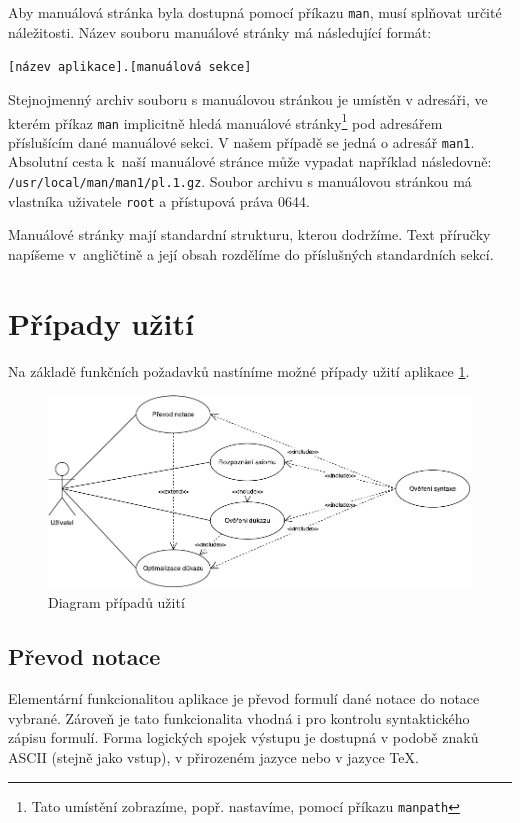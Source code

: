 \documentclass[thesis=B,czech,hidelinks]{thesis}[2012/06/26]
\begin{document}
Aby manuálová stránka byla dostupná pomocí příkazu \texttt{man}, musí splňovat určité náležitosti. Název souboru manuálové stránky má následující formát:

\begin{center}
\texttt{[název aplikace].[manuálová sekce]}
\end{center}

Stejnojmenný archiv souboru s manuálovou stránkou je umístěn v adresáři, ve kterém příkaz \texttt{man} implicitně hledá manuálové stránky\footnote{Tato umístění zobrazíme, popř. nastavíme, pomocí příkazu \texttt{manpath}} pod adresářem příslušícím dané manuálové sekci. V našem případě se jedná o adresář \texttt{man1}. Absolutní cesta k~naší manuálové stránce může vypadat například následovně: \texttt{/usr/local/man/man1/pl.1.gz}. Soubor archivu s manuálovou stránkou má vlastníka uživatele \texttt{root} a přístupová práva 0644.

Manuálové stránky mají standardní strukturu, kterou dodržíme. Text příručky napíšeme v~angličtině a její obsah rozdělíme do příslušných standardních sekcí.

\section{Případy užití}

Na základě funkčních požadavků nastíníme možné případy užití aplikace \ref{fig:use_cases}.

\begin{figure}
\centering
\caption{Diagram případů užití}
\label{fig:use_cases}
\includegraphics{diagrams/use_cases}
\end{figure}

\subsection{Převod notace}

Elementární funkcionalitou aplikace je převod formulí dané notace do notace vybrané. Zároveň je tato funkcionalita vhodná i pro kontrolu syntaktického zápisu formulí. Forma logických spojek výstupu je dostupná v podobě znaků ASCII (stejně jako vstup), v přirozeném jazyce nebo v jazyce \TeX.
\end{document}
